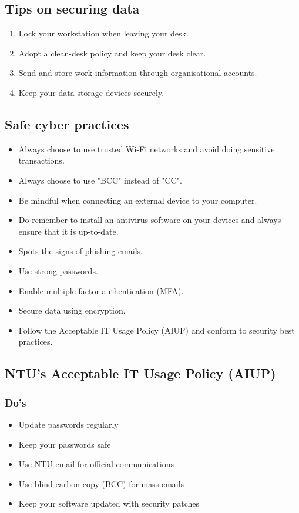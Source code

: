 \documentclass[11pt]{article}
\begin{document}
\subsection{Tips on securing data}
\label{sec:org39d5a1e}
\begin{enumerate}
\item Lock your workstation when leaving your desk.
\item Adopt a clean-desk policy and keep your desk clear.
\item Send and store work information through organisational accounts.
\item Keep your data storage devices securely.
\end{enumerate}

\subsection{Safe cyber practices}
\label{sec:orgc360204}
\begin{itemize}
\item Always choose to use trusted Wi-Fi networks and avoid doing sensitive transactions.
\item Always choose to use "BCC" instead of "CC".
\item Be mindful when connecting an external device to your computer.
\item Do remember to install an antivirus software on your devices and always ensure that it is up-to-date.
\item Spots the signs of phishing emails.
\item Use strong passwords.
\item Enable multiple factor authentication (MFA).
\item Secure data using encryption.
\item Follow the Acceptable IT Usage Policy (AIUP) and conform to security best practices.
\end{itemize}

\subsection{NTU's Acceptable IT Usage Policy (AIUP)}
\label{sec:orgfb9cfc9}

\subsubsection{Do's}
\label{sec:orga6ba44e}
\begin{itemize}
\item Update passwords regularly
\item Keep your passwords safe
\item Use NTU email for official communications
\item Use blind carbon copy (BCC) for mass emails
\item Keep your software updated with security patches
\end{itemize}
\end{document}
